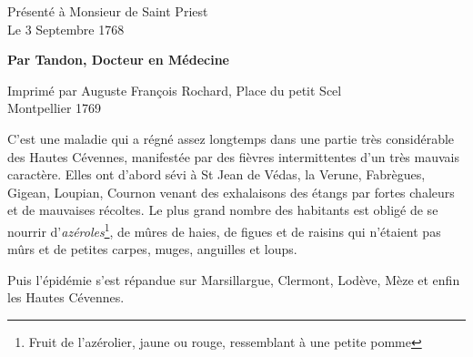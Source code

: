 {\begin{center}
Présenté à Monsieur de Saint Priest\\
Le 3 Septembre 1768

\vspace{0.35em}

{\bfseries Par Tandon, Docteur en Médecine\par}
Imprimé par Auguste François Rochard, Place du petit Scel\\
Montpellier 1769
\end{center}

\vspace{0.55em}

C’est une maladie qui a régné assez longtemps dans une partie très considérable des Hautes Cévennes, manifestée par des fièvres intermittentes d’un très mauvais caractère. Elles ont d’abord sévi à St Jean de Védas, la Verune, Fabrègues, Gigean, Loupian, Cournon venant des exhalaisons des étangs par fortes chaleurs et de mauvaises récoltes. Le plus grand nombre des habitants est obligé de se nourrir d’\textit{azéroles}\footnote{Fruit de l’azérolier, jaune ou rouge, ressemblant à une petite pomme}, de mûres de haies, de figues et de raisins qui n’étaient pas mûrs et de petites carpes, muges, anguilles et loups.

Puis l’épidémie s’est répandue sur Marsillargue, Clermont, Lodève, Mèze et enfin les Hautes Cévennes.

\vspace{0.3em}

}

